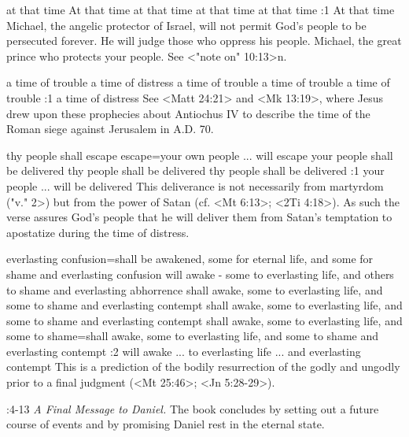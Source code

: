     {at that time} %
    {At that time} %
    {at that time} %
    {at that time} %
    {at that time} %
:1 {At that time} Michael, the angelic protector of Israel, will
 not permit God's people to be persecuted forever. He will judge those who oppress his
 people. Michael, the great prince who protects your people. See <"note on" 10:13>n.

    {a time of trouble} %
    {a time of distress} %
    {a time of trouble} %
    {a time of trouble} %
    {a time of trouble} %
:1 {a time of distress} 
See <Matt 24:21> and <Mk 13:19>, where Jesus drew upon these  prophecies about Antiochus  IV to describe the time of the Roman siege against Jerusalem in
 A.D. 70. 
 
    {thy people shall escape} %
    {escape}={your own people ... will escape} %
    {your people shall be delivered} %
    {thy people shall be delivered} %
    {thy people shall be delivered} %
:1 {your people ... will be  delivered} 
 This deliverance is not necessarily from martyrdom (\<"v." 2>) but from the power of Satan  (cf. <Mt 6:13>; <2Ti 4:18>). 
As such the verse assures God's people that he will deliver them from Satan's temptation to apostatize during the time of distress.
 
    {everlasting confusion}={shall be awakened, some for eternal life, and some for shame and everlasting confusion} %
    {will awake - some to everlasting life, and others to shame and everlasting abhorrence} %
    {shall awake, some to everlasting life, and some to shame and everlasting contempt} %
    {shall awake, some to everlasting life, and some to shame and everlasting contempt} %
    {shall awake, some to everlasting life, and some to shame}={shall awake, some to everlasting life, and some to shame and everlasting contempt} %
:2 {will awake ... to everlasting life ... and everlasting 
contempt} This is a prediction of the bodily resurrection of the 
godly and ungodly prior to a final judgment (<Mt 25:46>; <Jn 5:28-29>). 

:4-13 {} {\it A Final Message to Daniel.}\/ The book concludes by setting out a future course of events and by promising Daniel rest in the eternal state.

